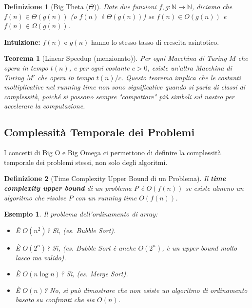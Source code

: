 \documentclass[a4paper]{article}
\newtheorem{theorem}{Teorema}[section]
\newtheorem{definition}{Definizione}[section]
\newtheorem{example}{Esempio}[section]
\begin{document}
\begin{definition}[Big Theta ($\Theta$)]
Date due funzioni $f, g: \mathbb{N} \to \mathbb{N}$, diciamo che $f(n) \in \Theta(g(n))$ (o $f(n)$ è $\Theta(g(n))$) se $f(n) \in O(g(n))$ e $f(n) \in \Omega(g(n))$.
\end{definition}
\textbf{Intuizione:} $f(n)$ e $g(n)$ hanno lo stesso tasso di crescita asintotico.

\begin{theorem}[Linear Speedup (menzionato)]
Per ogni Macchina di Turing $M$ che opera in tempo $t(n)$, e per ogni costante $c > 0$, esiste un'altra Macchina di Turing $M'$ che opera in tempo $t(n)/c$.
Questo teorema implica che le costanti moltiplicative nel running time non sono significative quando si parla di classi di complessità, poiché si possono sempre "compattare" più simboli sul nastro per accelerare la computazione.
\end{theorem}

\subsection{Complessità Temporale dei Problemi}
I concetti di Big O e Big Omega ci permettono di definire la complessità temporale dei problemi stessi, non solo degli algoritmi.

\begin{definition}[Time Complexity Upper Bound di un Problema]
Il \textbf{time complexity upper bound} di un problema $P$ è $O(f(n))$ se \emph{esiste almeno un algoritmo} che risolve $P$ con un running time $O(f(n))$.
\end{definition}
\begin{example}
Il problema dell'ordinamento di array:
\begin{itemize}
    \item È $O(n^2)$? Sì, (es. Bubble Sort).
    \item È $O(2^n)$? Sì, (es. Bubble Sort è anche $O(2^n)$, è un upper bound molto lasco ma valido).
    \item È $O(n \log n)$? Sì, (es. Merge Sort).
    \item È $O(n)$? No, si può dimostrare che non esiste un algoritmo di ordinamento basato su confronti che sia $O(n)$.
\end{itemize}
\end{example}
\end{document}
